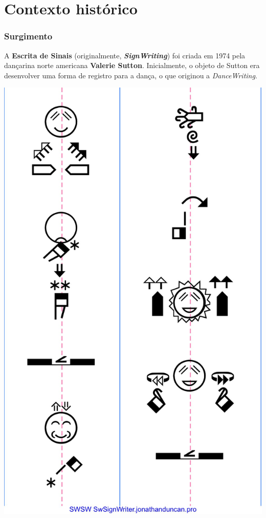 \documentclass[10pt]{beamer}
\theoremstyle{plain}
\theoremstyle{definition}
\begin{document}
	\begin{frame}
		\tableofcontents 
	\end{frame}
	
	\section{Contexto histórico}
	
	\begin{frame}
		\frametitle{Surgimento} 
		{
			A \textbf{Escrita de Sinais} (originalmente, \textbf{\textit{SignWriting}}) foi criada em 1974 pela dançarina norte americana \textbf{Valerie Sutton}. Inicialmente, o objeto de Sutton era desenvolver uma forma de registro para a dança, o que originou a \textit{DanceWriting}.
			
			\vspace{0.5cm}
			\includegraphics[scale=0.06]{figures/5ed8f275ad7ce03f8e6c80ac20281566.jpg}
			
}
\end{frame}
\end{document}
